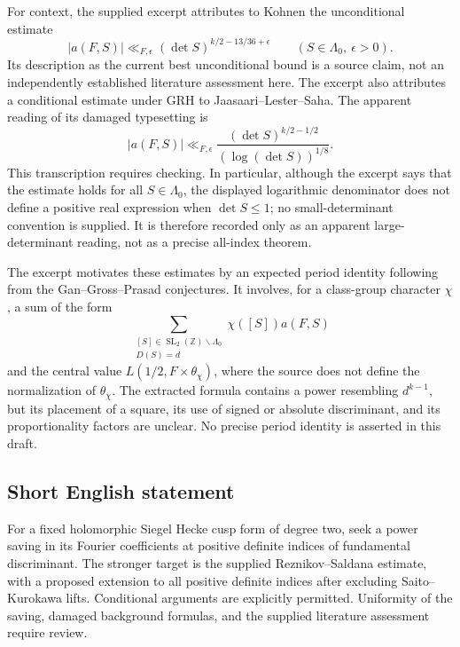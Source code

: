 \documentclass[11pt]{article}
\newcommand{\Z}{\mathbb{Z}}
\begin{document}
For context, the supplied excerpt attributes to Kohnen the unconditional estimate
\[
|a(F,S)|\ll_{F,\epsilon}(\det S)^{k/2-13/36+\epsilon}\qquad(S\in\Lambda_0,\ \epsilon>0).
\]
Its description as the current best unconditional bound is a source claim, not an independently established literature assessment here. The excerpt also attributes a conditional estimate under GRH to Jaasaari--Lester--Saha. The apparent reading of its damaged typesetting is
\[
|a(F,S)|\ll_{F,\epsilon}
\frac{(\det S)^{k/2-1/2}}{(\log(\det S))^{1/8}}.
\]
This transcription requires checking. In particular, although the excerpt says that the estimate holds for all \(S\in\Lambda_0\), the displayed logarithmic denominator does not define a positive real expression when \(\det S\le1\); no small-determinant convention is supplied. It is therefore recorded only as an apparent large-determinant reading, not as a precise all-index theorem.

The excerpt motivates these estimates by an expected period identity following from the Gan--Gross--Prasad conjectures. It involves, for a class-group character \(\chi\), a sum of the form
\[
\sum_{\substack{[S]\in\operatorname{SL}_2(\Z)\backslash\Lambda_0\\D(S)=d}}
\chi([S])a(F,S)
\]
and the central value \(L(1/2,F\times\theta_\chi)\), where the source does not define the normalization of \(\theta_\chi\). The extracted formula contains a power resembling \(d^{k-1}\), but its placement of a square, its use of signed or absolute discriminant, and its proportionality factors are unclear. No precise period identity is asserted in this draft.
\subsection{Short English statement}
For a fixed holomorphic Siegel Hecke cusp form of degree two, seek a power saving in its Fourier coefficients at positive definite indices of fundamental discriminant. The stronger target is the supplied Reznikov--Saldana estimate, with a proposed extension to all positive definite indices after excluding Saito--Kurokawa lifts. Conditional arguments are explicitly permitted. Uniformity of the saving, damaged background formulas, and the supplied literature assessment require review.
\end{document}
